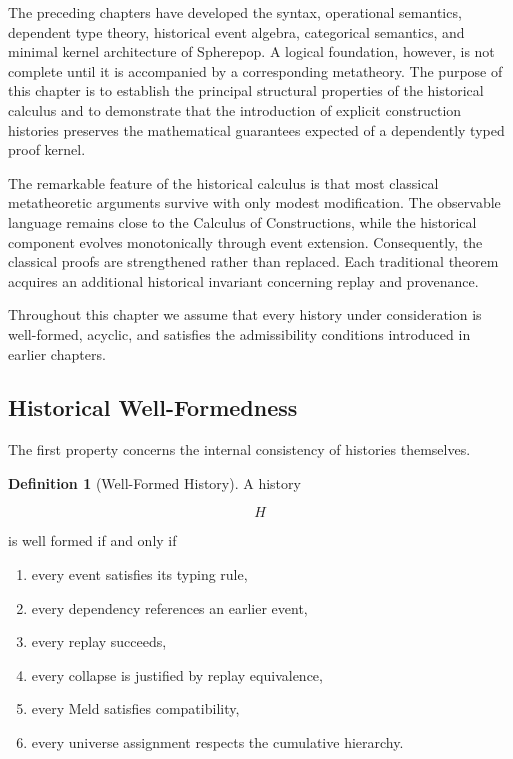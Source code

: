 \documentclass[12pt,oneside]{article}
\theoremstyle{definition}
\newtheorem{definition}[theorem]{Definition}
\theoremstyle{remark}
\begin{document}
The preceding chapters have developed the syntax, operational semantics,
dependent type theory, historical event algebra, categorical semantics, and
minimal kernel architecture of Spherepop. A logical foundation, however, is not
complete until it is accompanied by a corresponding metatheory. The purpose of
this chapter is to establish the principal structural properties of the
historical calculus and to demonstrate that the introduction of explicit
construction histories preserves the mathematical guarantees expected of a
dependently typed proof kernel.

The remarkable feature of the historical calculus is that most classical
metatheoretic arguments survive with only modest modification. The observable
language remains close to the Calculus of Constructions, while the historical
component evolves monotonically through event extension. Consequently, the
classical proofs are strengthened rather than replaced. Each traditional theorem
acquires an additional historical invariant concerning replay and provenance.

Throughout this chapter we assume that every history under consideration is
well-formed, acyclic, and satisfies the admissibility conditions introduced in
earlier chapters.

\subsection{Historical Well-Formedness}

The first property concerns the internal consistency of histories themselves.

\begin{definition}[Well-Formed History]

A history

\[
H
\]

is well formed if and only if

\begin{enumerate}

\item every event satisfies its typing rule,

\item every dependency references an earlier event,

\item every replay succeeds,

\item every collapse is justified by replay equivalence,

\item every Meld satisfies compatibility,

\item every universe assignment respects the cumulative hierarchy.

\end{enumerate}

\end{definition}
\end{document}
